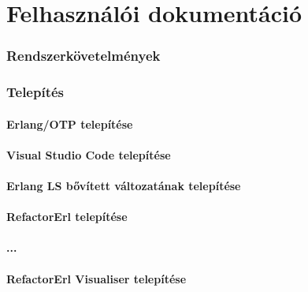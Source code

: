 \chapter{Felhasználói dokumentáció}
\label{ch:user}

\subsection{Rendszerkövetelmények}
\subsection{Telepítés}
\subsubsection{Erlang/OTP telepítése}
\subsubsection{Visual Studio Code telepítése}
\subsubsection{Erlang LS bővített változatának telepítése}
\subsubsection{RefactorErl telepítése}
\subsubsection{...}
\subsubsection{RefactorErl Visualiser telepítése}

\subsection{}